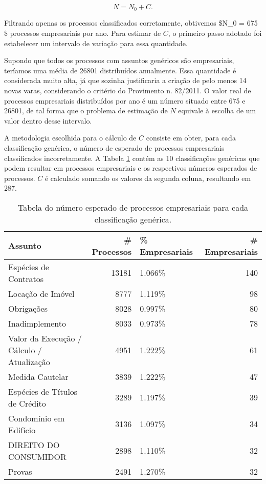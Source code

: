 \documentclass[]{book}
\begin{document}
\[ 
N = N_0 + C.
\]

Filtrando apenas os processos classificados corretamente, obtivemos
\$N\_0 = 675 \$ processos empresariais por ano. Para estimar de \(C\), o
primeiro passo adotado foi estabelecer um intervalo de variação para
essa quantidade.

Supondo que todos os processos com assuntos genéricos são empresariais,
teríamos uma média de 26801 distribuídos anualmente. Essa quantidade é
considerada muito alta, já que sozinha justificaria a criação de pelo
menos 14 novas varas, considerando o critério do Provimento n. 82/2011.
O valor real de processos empresariais distribuídos por ano é um número
situado entre 675 e 26801, de tal forma que o problema de estimação de
\(N\) equivale à escolha de um valor dentro desse intervalo.

A metodologia escolhida para o cálculo de \(C\) consiste em obter, para
cada classificação genérica, o número de esperado de processos
empresariais classificados incorretamente. A Tabela \ref{tab:esperados}
contém as 10 classificações genéricas que podem resultar em processos
empresariais e os respectivos números esperados de processos. \(C\) é
calculado somando os valores da segunda coluna, resultando em 287.

\begin{longtable}[t]{lrlr}
\caption{\label{tab:esperados}Tabela do número esperado de processos empresariais para cada classificação genérica.}\\
\toprule
Assunto & \# Processos & \% Empresariais & \# Empresariais\\
\midrule
Espécies de Contratos & 13181 & 1.066\% & 140\\
Locação de Imóvel & 8777 & 1.119\% & 98\\
Obrigações & 8028 & 0.997\% & 80\\
Inadimplemento & 8033 & 0.973\% & 78\\
Valor da Execução / Cálculo / Atualização & 4951 & 1.222\% & 61\\
\addlinespace
Medida Cautelar & 3839 & 1.222\% & 47\\
Espécies de Títulos de Crédito & 3289 & 1.197\% & 39\\
Condomínio em Edifício & 3136 & 1.097\% & 34\\
DIREITO DO CONSUMIDOR & 2898 & 1.110\% & 32\\
Provas & 2491 & 1.270\% & 32\\
\bottomrule
\end{longtable}
\end{document}
